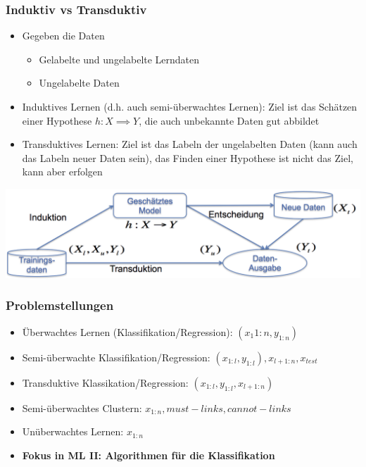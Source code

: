 \documentclass[paper=a4, fontsize=11pt]{scrartcl} %
\numberwithin{equation}{section} %
\numberwithin{figure}{section} %
\numberwithin{table}{section} %
\begin{document}
\subsubsection{Induktiv vs Transduktiv}

\begin{itemize}
\item Gegeben die Daten
\begin{itemize}
\item Gelabelte und ungelabelte Lerndaten
\item Ungelabelte Daten
\end{itemize}
\item Induktives Lernen (d.h. auch semi-überwachtes Lernen): Ziel ist das Schätzen einer Hypothese $h: X \implies Y$, die auch unbekannte Daten gut abbildet
\item Transduktives Lernen: Ziel ist das Labeln der ungelabelten Daten (kann auch das Labeln neuer Daten sein), das Finden einer Hypothese ist nicht das Ziel, kann aber erfolgen
\end{itemize}

\includegraphics[width=\textwidth]{imgs/indvstran}

\subsubsection{Problemstellungen}

\begin{itemize}
\item Überwachtes Lernen (Klassifikation/Regression): ${(x_1{1:n}, y_{1:n})}$
\item Semi-überwachte Klassifikation/Regression: ${(x_{1:l}, y_{1:l}), x_{l+1:n}, x_{test}}$
\item Transduktive Klassikation/Regression: ${(x_{1:l}, y_{1:l}, x_{l+1:n})}$
\item Semi-überwachtes Clustern: ${x_{1:n}, must-links, cannot-links}$
\item Unüberwachtes Lernen: ${x_{1:n}}$
\item \textbf{Fokus in ML II: Algorithmen für die Klassifikation}
\end{itemize}
\newpage
\end{document}

